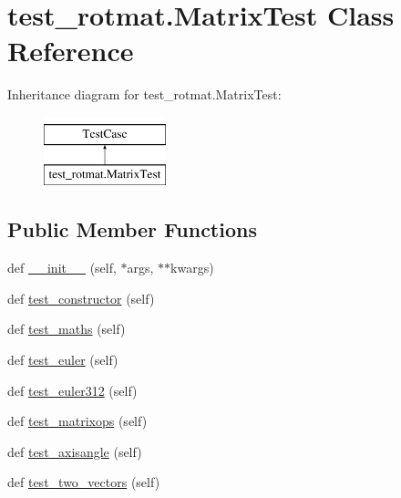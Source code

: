\hypertarget{classtest__rotmat_1_1MatrixTest}{}\section{test\+\_\+rotmat.\+Matrix\+Test Class Reference}
\label{classtest__rotmat_1_1MatrixTest}
Inheritance diagram for test\+\_\+rotmat.\+Matrix\+Test\+:\begin{figure}[H]
\begin{center}
\leavevmode
\includegraphics[height=2.000000cm]{classtest__rotmat_1_1MatrixTest}
\end{center}
\end{figure}
\subsection*{Public Member Functions}
\begin{DoxyCompactItemize}
\item 
def \mbox{\hyperlink{classtest__rotmat_1_1MatrixTest_ad3451332b0af3615b6aa39909ce01031}{\+\_\+\+\_\+init\+\_\+\+\_\+}} (self, $\ast$args, $\ast$$\ast$kwargs)
\item 
def \mbox{\hyperlink{classtest__rotmat_1_1MatrixTest_aeab56837acc2e57cac7c493c05badaa6}{test\+\_\+constructor}} (self)
\item 
def \mbox{\hyperlink{classtest__rotmat_1_1MatrixTest_a31a4a587eae674aae8e1e40001864656}{test\+\_\+maths}} (self)
\item 
def \mbox{\hyperlink{classtest__rotmat_1_1MatrixTest_a1e52b5838a3b190fc65ede505f4823ab}{test\+\_\+euler}} (self)
\item 
def \mbox{\hyperlink{classtest__rotmat_1_1MatrixTest_a9ee7aff49ac9682b2ae4acc8b6a5424c}{test\+\_\+euler312}} (self)
\item 
def \mbox{\hyperlink{classtest__rotmat_1_1MatrixTest_a7ed2f1e8f790c38bfe120e9817e5a4fb}{test\+\_\+matrixops}} (self)
\item 
def \mbox{\hyperlink{classtest__rotmat_1_1MatrixTest_a2252dfc239e943141b12225cbd62a65d}{test\+\_\+axisangle}} (self)
\item 
def \mbox{\hyperlink{classtest__rotmat_1_1MatrixTest_a02d650c3e419de814138dd31a224651e}{test\+\_\+two\+\_\+vectors}} (self)
\end{DoxyCompactItemize}


